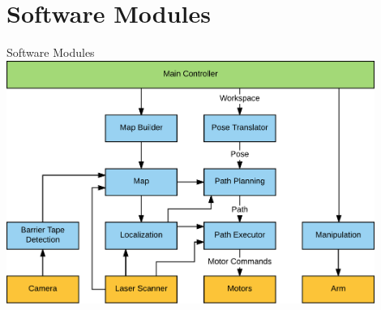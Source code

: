 \section{Software Modules}
\begin{frame}{Software Modules}
    \centering \includegraphics[width=0.9\textwidth]{slides/gfx/software_modules}
\end{frame}


